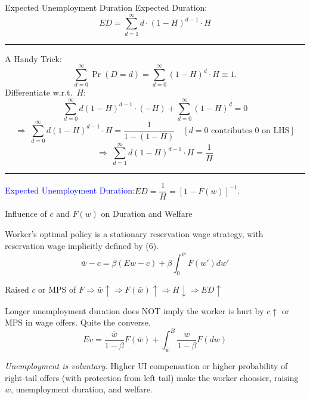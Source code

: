 \documentclass[aspectratio=169,xcolor=dvipsnames]{beamer}
\let\tempone\itemize
\let\temptwo\enditemize
\renewenvironment{itemize}{\tempone\addtolength{\itemsep}{\fill}}{\temptwo}
\begin{document}
\begin{frame}{Expected Unemployment Duration}
\label{slide:McCall_18}
\footnotesize
Expected Duration:
\[
ED=\sum_{d=1}^{\infty} d\cdot (1-H)^{d-1}\cdot H
\]

\hrule
\smallskip
A Handy Trick:
\[
\sum_{d=0}^{\infty}\Pr(D=d)=\sum_{d=0}^{\infty}(1-H)^d\cdot H \equiv 1.
\]
Differentiate w.r.t.\ $H$:
\[
\sum_{d=0}^{\infty} d(1-H)^{d-1}\cdot (-H)
+\sum_{d=0}^{\infty}(1-H)^d =0
\]
\[
\Rightarrow\ \sum_{d=0}^{\infty} d(1-H)^{d-1}\cdot H = \frac{1}{1-(1-H)}
\quad [d=0\text{ contributes 0 on LHS}]
\]
\[
\Rightarrow\ \sum_{d=1}^{\infty} d(1-H)^{d-1}\cdot H = \frac{1}{H}
\]
\hrule
\smallskip
\textcolor{blue}{Expected Unemployment Duration:}\quad $ED=\dfrac{1}{H}=[1-F(\bar w)]^{-1}$.
\end{frame}

\begin{frame}{Influence of $c$ and $F(w)$ on Duration and Welfare}
\label{slide:McCall_19}
\small
\begin{itemize}
    \item Worker's optimal policy is a stationary reservation wage strategy, with reservation wage implicitly defined by (6).
    \[
        \bar w-c=\beta(Ew-c)+\beta\int_0^{\bar w}F(w')dw' \tag{6}
    \]
    \item Raised $c$ or MPS of $F\Rightarrow \bar w\uparrow \Rightarrow F(\bar w)\uparrow \Rightarrow H\downarrow \Rightarrow ED\uparrow$
    \item Longer unemployment duration does NOT imply the worker is hurt by $c\uparrow$ or MPS in wage offers. Quite the converse.
    \[
        Ev=\frac{\bar w}{1-\beta}F(\bar w)+\int_{\bar w}^{B}\frac{w}{1-\beta}F(dw)
    \]
    \item \emph{Unemployment is voluntary.} Higher UI compensation or higher probability of right-tail offers (with protection from left tail) make the worker choosier, raising $\bar w$, unemployment duration, and welfare.
\end{itemize}
\end{frame}
\end{document}
